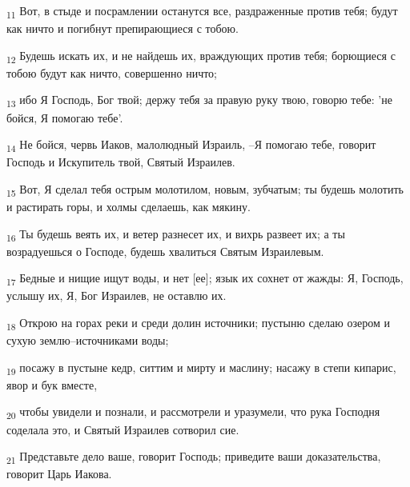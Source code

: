 \begin{tcolorbox}
\textsubscript{11} Вот, в стыде и посрамлении останутся все, раздраженные против тебя; будут как ничто и погибнут препирающиеся с тобою.
\end{tcolorbox}
\begin{tcolorbox}
\textsubscript{12} Будешь искать их, и не найдешь их, враждующих против тебя; борющиеся с тобою будут как ничто, совершенно ничто;
\end{tcolorbox}
\begin{tcolorbox}
\textsubscript{13} ибо Я Господь, Бог твой; держу тебя за правую руку твою, говорю тебе: 'не бойся, Я помогаю тебе'.
\end{tcolorbox}
\begin{tcolorbox}
\textsubscript{14} Не бойся, червь Иаков, малолюдный Израиль, --Я помогаю тебе, говорит Господь и Искупитель твой, Святый Израилев.
\end{tcolorbox}
\begin{tcolorbox}
\textsubscript{15} Вот, Я сделал тебя острым молотилом, новым, зубчатым; ты будешь молотить и растирать горы, и холмы сделаешь, как мякину.
\end{tcolorbox}
\begin{tcolorbox}
\textsubscript{16} Ты будешь веять их, и ветер разнесет их, и вихрь развеет их; а ты возрадуешься о Господе, будешь хвалиться Святым Израилевым.
\end{tcolorbox}
\begin{tcolorbox}
\textsubscript{17} Бедные и нищие ищут воды, и нет [ее]; язык их сохнет от жажды: Я, Господь, услышу их, Я, Бог Израилев, не оставлю их.
\end{tcolorbox}
\begin{tcolorbox}
\textsubscript{18} Открою на горах реки и среди долин источники; пустыню сделаю озером и сухую землю--источниками воды;
\end{tcolorbox}
\begin{tcolorbox}
\textsubscript{19} посажу в пустыне кедр, ситтим и мирту и маслину; насажу в степи кипарис, явор и бук вместе,
\end{tcolorbox}
\begin{tcolorbox}
\textsubscript{20} чтобы увидели и познали, и рассмотрели и уразумели, что рука Господня соделала это, и Святый Израилев сотворил сие.
\end{tcolorbox}
\begin{tcolorbox}
\textsubscript{21} Представьте дело ваше, говорит Господь; приведите ваши доказательства, говорит Царь Иакова.
\end{tcolorbox}
